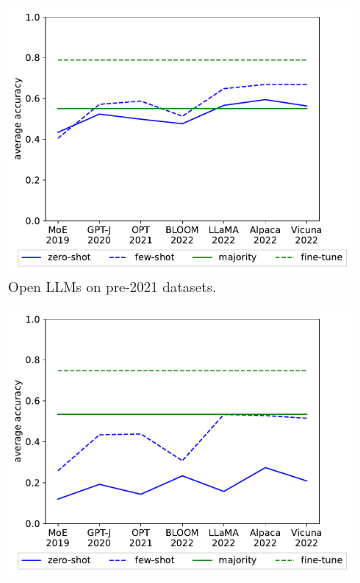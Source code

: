 \documentclass[letterpaper]{article} %
\begin{document}
\begin{figure}[t]
\begin{subfigure}[b]{0.475\textwidth}
            \label{fig:GPT-new-datasets}
        \end{subfigure}
        \begin{subfigure}[b]{0.475\textwidth}
            \centering
            \includegraphics[scale=0.45]{img/output-zero-few-shot-old-dataset-recent-llm.pdf}
            \caption[]%
            {{Open LLMs on pre-2021 datasets.}}
            \label{fig:Open-old-datasets}
        \end{subfigure}
        \begin{subfigure}[b]{0.475\textwidth}
            \centering
            \includegraphics[scale=0.45]{img/output-zero-few-shot-new-dataset-recent-llm.pdf}

\end{subfigure}
\end{figure}
\end{document}
